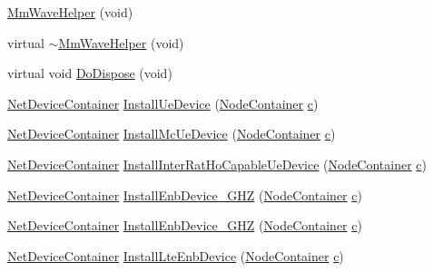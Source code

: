 \begin{DoxyCompactItemize}
\item 
\hyperlink{classns3_1_1MmWaveHelper_a8acf1e1c476b8ac12107d93446c93a77}{Mm\+Wave\+Helper} (void)
\item 
virtual \hyperlink{classns3_1_1MmWaveHelper_a96cf0b57e986599567bbd9d717e825ce}{$\sim$\+Mm\+Wave\+Helper} (void)
\item 
virtual void \hyperlink{classns3_1_1MmWaveHelper_a0fcc9bd80bc83d7a95a96bdbbdfa7735}{Do\+Dispose} (void)
\item 
\hyperlink{classns3_1_1NetDeviceContainer}{Net\+Device\+Container} \hyperlink{classns3_1_1MmWaveHelper_a9311c819d7ee539c8710c5b7e98df37a}{Install\+Ue\+Device} (\hyperlink{classns3_1_1NodeContainer}{Node\+Container} \hyperlink{mmwave_2model_2fading-traces_2fading__trace__generator_8m_ae0323a9039add2978bf5b49550572c7c}{c})
\item 
\hyperlink{classns3_1_1NetDeviceContainer}{Net\+Device\+Container} \hyperlink{classns3_1_1MmWaveHelper_a0d017af816f9651994b5ae38e55f4584}{Install\+Mc\+Ue\+Device} (\hyperlink{classns3_1_1NodeContainer}{Node\+Container} \hyperlink{mmwave_2model_2fading-traces_2fading__trace__generator_8m_ae0323a9039add2978bf5b49550572c7c}{c})
\item 
\hyperlink{classns3_1_1NetDeviceContainer}{Net\+Device\+Container} \hyperlink{classns3_1_1MmWaveHelper_a4a30b6e9361765ac818cebbf337b8231}{Install\+Inter\+Rat\+Ho\+Capable\+Ue\+Device} (\hyperlink{classns3_1_1NodeContainer}{Node\+Container} \hyperlink{mmwave_2model_2fading-traces_2fading__trace__generator_8m_ae0323a9039add2978bf5b49550572c7c}{c})
\item 
\hyperlink{classns3_1_1NetDeviceContainer}{Net\+Device\+Container} \hyperlink{classns3_1_1MmWaveHelper_a3e0d0318741fcb8717b2db52bbe63d3c}{Install\+Enb\+Device\+\_\+G\+HZ} (\hyperlink{classns3_1_1NodeContainer}{Node\+Container} \hyperlink{mmwave_2model_2fading-traces_2fading__trace__generator_8m_ae0323a9039add2978bf5b49550572c7c}{c})
\item 
\hyperlink{classns3_1_1NetDeviceContainer}{Net\+Device\+Container} \hyperlink{classns3_1_1MmWaveHelper_aab63ebad5509a2c9392d6de3668b0d09}{Install\+Enb\+Device\+\_\+G\+HZ} (\hyperlink{classns3_1_1NodeContainer}{Node\+Container} \hyperlink{mmwave_2model_2fading-traces_2fading__trace__generator_8m_ae0323a9039add2978bf5b49550572c7c}{c})
\item 
\hyperlink{classns3_1_1NetDeviceContainer}{Net\+Device\+Container} \hyperlink{classns3_1_1MmWaveHelper_a5c265e74ff3134d117adabadb1e25357}{Install\+Lte\+Enb\+Device} (\hyperlink{classns3_1_1NodeContainer}{Node\+Container} \hyperlink{mmwave_2model_2fading-traces_2fading__trace__generator_8m_ae0323a9039add2978bf5b49550572c7c}{c})

\end{DoxyCompactItemize}
